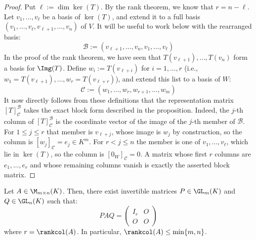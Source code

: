 \begin{proof}
Put $\ell := \dim \ker(T)$. By the rank theorem, we know that $r = n - \ell$. Let $v_1, \dots, v_\ell$ be a basis of $\ker(T)$, and extend it to a full basis $(v_1, \dots, v_\ell, v_{\ell+1}, \dots, v_n)$ of $V$. It will be useful to work below with the rearranged basis:
\begin{equation*}
    \mathcal{B} := (v_{\ell+1}, \dots, v_n, v_1, \dots, v_\ell)
\end{equation*}
In the proof of the rank theorem, we have seen that $T(v_{\ell+1}), \dots, T(v_n)$ form a basis for $\Img(T)$. Define $w_i := T(v_{\ell+i})$ for $i = 1, \dots, r$ (i.e., $w_1 = T(v_{\ell+1}), \dots, w_r = T(v_{\ell+r})$), and extend this list to a basis of $W$:
\begin{equation*}
    \mathcal{C} := (w_1, \dots, w_r, w_{r+1}, \dots, w_m)
\end{equation*}
It now directly follows from these definitions that the representation matrix $[T]_{\mathcal{C}}^{\mathcal{B}}$ takes the exact block form described in the proposition. Indeed, the $j$-th column of $[T]_{\mathcal{C}}^{\mathcal{B}}$ is the coordinate vector of the image of the $j$-th member of $\mathcal{B}$. For $1 \le j \le r$ that member is $v_{\ell+j}$, whose image is $w_j$ by construction, so the column is $[w_j]_{\mathcal{C}} = e_j \in K^m$. For $r < j \le n$ the member is one of $v_1, \dots, v_\ell$, which lie in $\ker(T)$, so the column is $[0_W]_{\mathcal{C}} = 0$. A matrix whose first $r$ columns are $e_1, \dots, e_r$ and whose remaining columns vanish is exactly the asserted block matrix.
\end{proof}

\begin{corollary}
\label{cor:matrix_equivalence_normal_form}
Let $A \in \M_{m \times n}(K)$. Then, there exist invertible matrices $P \in \GL_m(K)$ and $Q \in \GL_n(K)$ such that:
\begin{equation*}
    PAQ = \begin{pmatrix} I_r & O \\ O & O \end{pmatrix}
\end{equation*}
where $r = \rankcol(A)$. In particular, $\rankcol(A) \le \min\{m, n\}$.
\end{corollary}


